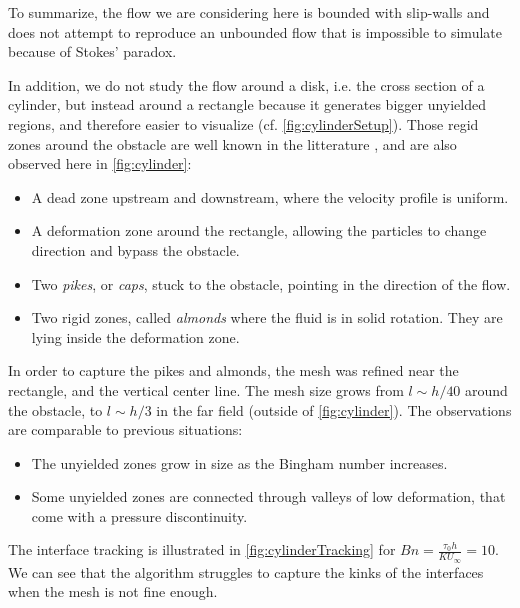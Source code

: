 \documentclass[11 pt]{report}
\begin{document}
To summarize, the flow we are considering here is bounded with slip-walls and does not attempt to reproduce an unbounded flow that is impossible to simulate because of Stokes' paradox.



In addition, we do not study the flow around a disk, i.e. the cross section of a cylinder, but instead around a rectangle because it generates bigger unyielded regions, and therefore easier to visualize (cf. \cref{fig:cylinderSetup}). Those regid zones around the obstacle are well known in the litterature \cite{adaptiveCylinder,simulationCylinder}, and are also observed here in \cref{fig:cylinder}:
\begin{itemize}
    \item A dead zone upstream and downstream, where the velocity profile is uniform.
    \item A deformation zone around the rectangle, allowing the particles to change direction and bypass the obstacle.
    \item Two \textit{pikes}, or \textit{caps}, stuck to the obstacle, pointing in the direction of the flow.
    \item Two rigid zones, called \textit{almonds} where the fluid is in solid rotation. They are lying inside the deformation zone.
\end{itemize}

In order to capture the pikes and almonds, the mesh was refined near the rectangle, and the vertical center line. The mesh size grows from $l \sim h/40$ around the obstacle, to $l \sim h/3$ in the far field (outside of \cref{fig:cylinder}). The observations are comparable to previous situations:
\begin{itemize}
    \item The unyielded zones grow in size as the Bingham number increases.
    \item Some unyielded zones are connected through valleys of low deformation, that come with a pressure discontinuity.
\end{itemize}

The interface tracking is illustrated in \cref{fig:cylinderTracking} for $Bn=\frac{\tau_0 h}{K U_{\infty}}=10$. We can see that the algorithm struggles to capture the kinks of the interfaces when the mesh is not fine enough. 
\end{document}
